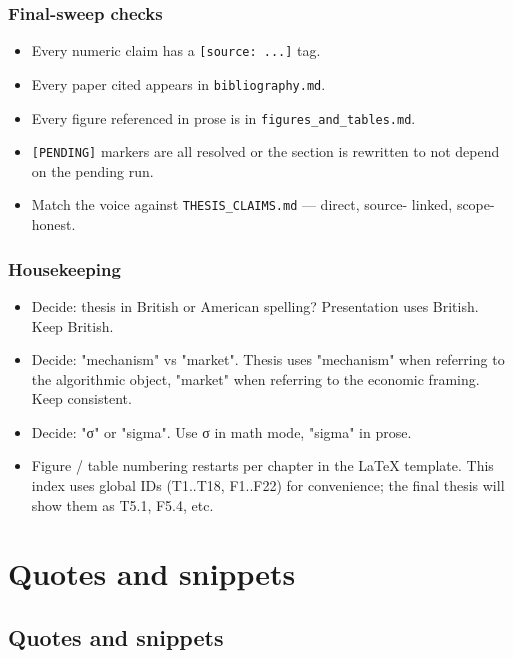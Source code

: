 \documentclass[11pt,a4paper,openany]{report}
\begin{document}
\section{Final-sweep checks}

\begin{itemize}
  \item [ ] Every numeric claim has a \texttt{[source: ...]} tag.
  \item [ ] Every paper cited appears in \texttt{bibliography.md}.
  \item [ ] Every figure referenced in prose is in \texttt{figures\_and\_tables.md}.
  \item [ ] \texttt{[PENDING]} markers are all resolved or the section is rewritten
    to not depend on the pending run.
  \item [ ] Match the voice against \texttt{THESIS\_CLAIMS.md} — direct, source-
    linked, scope-honest.
\end{itemize}

\section{Housekeeping}

\begin{itemize}
  \item [ ] Decide: thesis in British or American spelling? Presentation
    uses British. Keep British.
  \item [ ] Decide: "mechanism" vs "market". Thesis uses "mechanism" when
    referring to the algorithmic object, "market" when referring to the
    economic framing. Keep consistent.
  \item [ ] Decide: "σ" or "sigma". Use σ in math mode, "sigma" in prose.
  \item [ ] Figure / table numbering restarts per chapter in the LaTeX
    template. This index uses global IDs (T1..T18, F1..F22) for
    convenience; the final thesis will show them as T5.1, F5.4, etc.
\end{itemize}

\part*{Quotes and snippets}
\chapter{Quotes and snippets}
\end{document}

